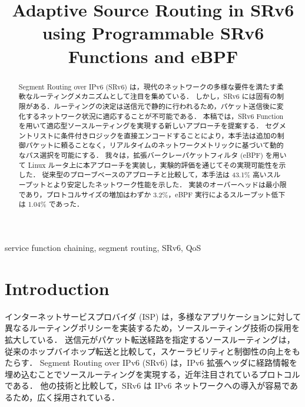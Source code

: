\documentclass[conference]{IEEEtran}
\begin{document}
\title{Adaptive Source Routing in SRv6 using Programmable SRv6 Functions and eBPF}

\author{
}

\maketitle

\begin{abstract}
  Segment Routing over IPv6 (SRv6) は，現代のネットワークの多様な要件を満たす柔軟なルーティングメカニズムとして注目を集めている．
  しかし，SRv6 には固有の制限がある．ルーティングの決定は送信元で静的に行われるため，パケット送信後に変化するネットワーク状況に適応することが不可能である．
  本稿では，SRv6 Function を用いて適応型ソースルーティングを実現する新しいアプローチを提案する．
  セグメントリストに条件付きロジックを直接エンコードすることにより，本手法は追加の制御パケットに頼ることなく，リアルタイムのネットワークメトリックに基づいて動的なパス選択を可能にする．
  我々は，拡張バークレーパケットフィルタ (eBPF) を用いて Linux ルータ上に本アプローチを実装し，実験的評価を通じてその実現可能性を示した．
  従来型のプローブベースのアプローチと比較して，本手法は 43.1\% 高いスループットとより安定したネットワーク性能を示した．
  実装のオーバーヘッドは最小限であり，プロトコルサイズの増加はわずか 3.2\%，eBPF 実行によるスループット低下は 1.04\% であった．
\end{abstract}

\begin{IEEEkeywords}
  service function chaining, segment routing, SRv6, QoS
\end{IEEEkeywords}

\section{Introduction}

インターネットサービスプロバイダ (ISP) は，多様なアプリケーションに対して異なるルーティングポリシーを実装するため，ソースルーティング技術の採用を拡大している\cite{cisco_rakuten_srv6}\cite{softbank_srv6}．
送信元がパケット転送経路を指定するソースルーティングは，従来のホップバイホップ転送と比較して，スケーラビリティと制御性の向上をもたらす．
Segment Routing over IPv6 (SRv6) は，IPv6 拡張ヘッダに経路情報を埋め込むことでソースルーティングを実現する，近年注目されているプロトコルである．
他の技術と比較して，SRv6 は IPv6 ネットワークへの導入が容易であるため，広く採用されている．
\end{document}
